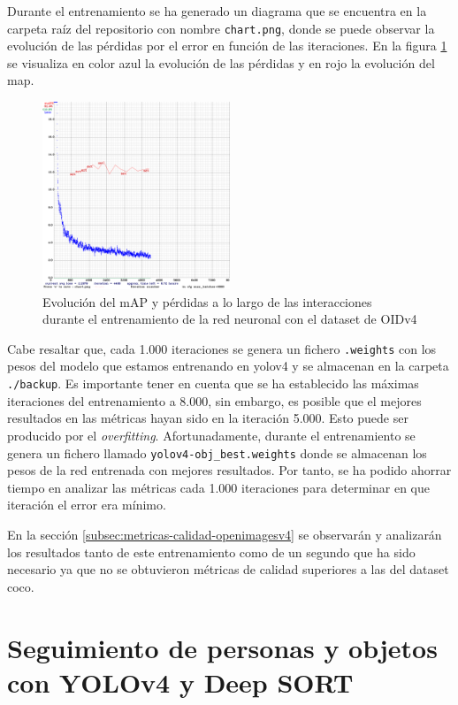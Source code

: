 Durante el entrenamiento se ha generado un diagrama que se encuentra en la carpeta raíz del repositorio con nombre \texttt{chart.png}, donde se puede observar la evolución de las pérdidas por el error en función de las iteraciones. En la figura \ref{fig:chart-train} se visualiza en color azul la evolución de las pérdidas y en rojo la evolución del \gls{map}.

\begin{figure}[ht]
\centering
\includegraphics[width=0.5\textwidth]{img/chapters/desarrollo/chart_train.png}
\caption{\label{fig:chart-train}Evolución del mAP y pérdidas a lo largo de las interacciones durante el entrenamiento de la red neuronal con el dataset de OIDv4}
\end{figure}

Cabe resaltar que, cada 1.000 iteraciones se genera un fichero \texttt{.weights} con los pesos del modelo que estamos entrenando en \gls{yolov4} y se almacenan en la carpeta \texttt{./backup}. Es importante tener en cuenta que se ha establecido las máximas iteraciones del entrenamiento a 8.000, sin embargo, es posible que el mejores resultados en las métricas hayan sido en la iteración 5.000. Esto puede ser producido por el \textit{overfitting}. Afortunadamente, durante el entrenamiento se genera un fichero llamado \texttt{yolov4-obj\_best.weights} donde se almacenan los pesos de la red entrenada con mejores resultados. Por tanto, se ha podido ahorrar tiempo en analizar las métricas cada 1.000 iteraciones para determinar en que iteración el error era mínimo.

En la sección \ref{subsec:metricas-calidad-openimagesv4} se observarán y analizarán los resultados tanto de este entrenamiento como de un segundo que ha sido necesario ya que no se obtuvieron métricas de calidad superiores a las del dataset \gls{coco}.

\section{Seguimiento de personas y objetos con YOLOv4 y Deep SORT}
\label{sec:desarrollo-yolov4+deepsort}

